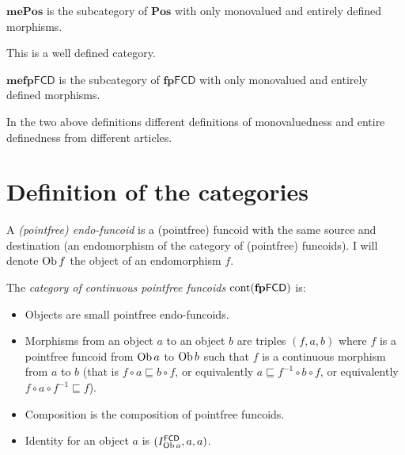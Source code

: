 
\begin{defn}
  $\mathbf{mePos}$ is the subcategory of $\mathbf{Pos}$ with
  only monovalued and entirely defined morphisms.
\end{defn}

\begin{obvious}
This is a well defined category.{\hspace*{\fill}}{\medskip}
\end{obvious}

\begin{defn}
  $\mathbf{mefp} \mathsf{FCD}$ is the subcategory of
  $\mathbf{fp} \mathsf{FCD}$ with only monovalued and entirely
  defined morphisms.
\end{defn}

\begin{rem}
  In the two above definitions different definitions of monovaluedness and
  entire definedness from different articles.
\end{rem}

\section{Definition of the categories}

\begin{defn}
  A \emph{(pointfree) endo-funcoid} is a (pointfree) funcoid with the same
  source and destination (an endomorphism of the category of (pointfree)
  funcoids). I will denote $\operatorname{Ob} f$ the object of an endomorphism $f$.
\end{defn}

\begin{obvious}
The \emph{category of continuous pointfree funcoids} $\operatorname{cont}
(\mathbf{fp} \mathsf{FCD})$ is:
\begin{itemize}
  \item Objects are small pointfree endo-funcoids.
  
  \item Morphisms from an object $a$ to an object $b$ are triples $(f , a ,
  b)$ where $f$ is a pointfree funcoid from $\operatorname{Ob} a$ to $\operatorname{Ob} b$
  such that $f$ is a continuous morphism from $a$ to $b$ (that is $f \circ a
  \sqsubseteq b \circ f$, or equivalently $a \sqsubseteq f^{- 1} \circ b \circ
  f$, or equivalently $f \circ a \circ f^{- 1} \sqsubseteq f$).
  
  \item Composition is the composition of pointfree funcoids.
  
  \item Identity for an object $a$ is $(I^{\mathsf{FCD}}_{\operatorname{Ob} a}
  , a , a)$.
\end{itemize}
\end{obvious}

